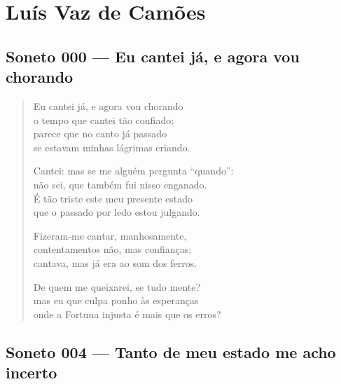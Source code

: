 \documentclass[10pt,a5paper,oneside]{book}
\begin{document}
\part{Luís Vaz de Camões}

\chapter{Soneto 000 --- Eu cantei já, e agora vou chorando}

\begin{verse}
Eu cantei já, e agora vou chorando\\
o tempo que cantei tão confiado;\\
parece que no canto já passado\\
se estavam minhas lágrimas criando.

Cantei: mas se me alguém pergunta ``quando'':\\
não sei, que também fui nisso enganado.\\
É tão triste este meu presente estado\\
que o passado por ledo estou julgando.

Fizeram-me cantar, manhosamente,\\
contentamentos não, mas confianças;\\
cantava, mas já era ao som dos ferros.

De quem me queixarei, se tudo mente?\\
mas eu que culpa ponho às esperanças\\
onde a Fortuna injusta é mais que os erros?
\end{verse}

\chapter{Soneto 004 --- Tanto de meu estado me acho incerto}
\end{document}
